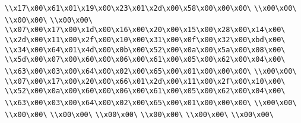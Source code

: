 \verb|\\x17\x00\x61\x01\x19\x00\x23\x01\x2d\x00\x58\x00\x00\x00\|\newline
\verb|\\x00\x00\|\newline
\verb|\\x00\x00\|\newline
\verb|\\x00\x00\|\newline
\verb|\\x07\x00\x17\x00\x1d\x00\x16\x00\x20\x00\x15\x00\x28\x00\x14\x00\|\newline
\verb|\\x2d\x00\x11\x00\x2f\x00\x10\x00\x31\x00\x0f\x00\x32\x00\xbd\x00\|\newline
\verb|\\x34\x00\x64\x01\x4d\x00\x0b\x00\x52\x00\x0a\x00\x5a\x00\x08\x00\|\newline
\verb|\\x5d\x00\x07\x00\x60\x00\x06\x00\x61\x00\x05\x00\x62\x00\x04\x00\|\newline
\verb|\\x63\x00\x03\x00\x64\x00\x02\x00\x65\x00\x01\x00\x00\x00\|\newline
\verb|\\x00\x00\|\newline
\verb|\\x07\x00\x17\x00\x20\x00\x66\x01\x2d\x00\x11\x00\x2f\x00\x10\x00\|\newline
\verb|\\x52\x00\x0a\x00\x60\x00\x06\x00\x61\x00\x05\x00\x62\x00\x04\x00\|\newline
\verb|\\x63\x00\x03\x00\x64\x00\x02\x00\x65\x00\x01\x00\x00\x00\|\newline
\verb|\\x00\x00\|\newline
\verb|\\x00\x00\|\newline
\verb|\\x00\x00\|\newline
\verb|\\x00\x00\|\newline
\verb|\\x00\x00\|\newline
\verb|\\x00\x00\|\newline
\verb|\\x00\x00\|\newline

